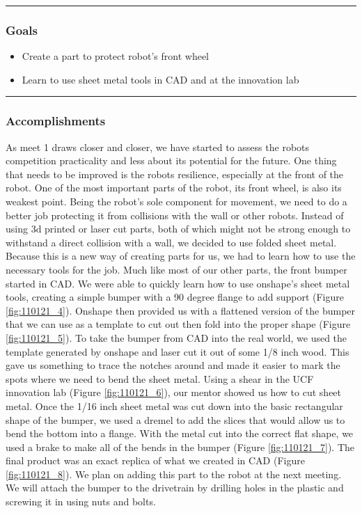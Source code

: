 \noindent\hfil\rule{\textwidth}{.4pt}\hfil
\subsubsection*{Goals}
\begin{itemize}
    \item Create a part to protect robot’s front wheel
    \item Learn to use sheet metal tools in CAD and at the innovation lab
\end{itemize} 

\noindent\hfil\rule{\textwidth}{.4pt}\hfil

\subsubsection*{Accomplishments}
As meet 1 draws closer and closer, we have started to assess the robots competition practicality and less about its potential for the future. One thing that needs to be improved is the robots resilience, especially at the front of the robot. One of the most important parts of the robot, its front wheel, is also its weakest point. Being the robot’s sole component for movement, we need to do a better job protecting it from collisions with the wall or other robots. Instead of using 3d printed or laser cut parts, both of which might not be strong enough to withstand a direct collision with a wall, we decided to use folded sheet metal. 
Because this is a new way of creating parts for us, we had to learn how to use the necessary tools for the job. Much like most of our other parts, the front bumper started in CAD. We were able to quickly learn how to use onshape’s sheet metal tools, creating a simple bumper with a 90 degree flange to add support (Figure \ref{fig:110121_4}). Onshape then provided us with a flattened version of the bumper that we can use as a template to cut out then fold into the proper shape (Figure \ref{fig:110121_5}).
To take the bumper from CAD into the real world, we used the template generated by onshape and laser cut it out of some 1/8 inch wood. This gave us something to trace the notches around and made it easier to mark the spots where we need to bend the sheet metal. Using a shear in the UCF innovation lab (Figure \ref{fig:110121_6}), our mentor showed us how to cut sheet metal. Once the 1/16 inch sheet metal was cut down into the basic rectangular shape of the bumper, we used a dremel to add the slices that would allow us to bend the bottom into a flange. With the metal cut into the correct flat shape, we used a brake to make all of the bends in the bumper (Figure \ref{fig:110121_7}). The final product was an exact replica of what we created in CAD (Figure \ref{fig:110121_8}). We plan on adding this part to the robot at the next meeting. We will attach the bumper to the drivetrain by drilling holes in the plastic and screwing it in using nuts and bolts.

